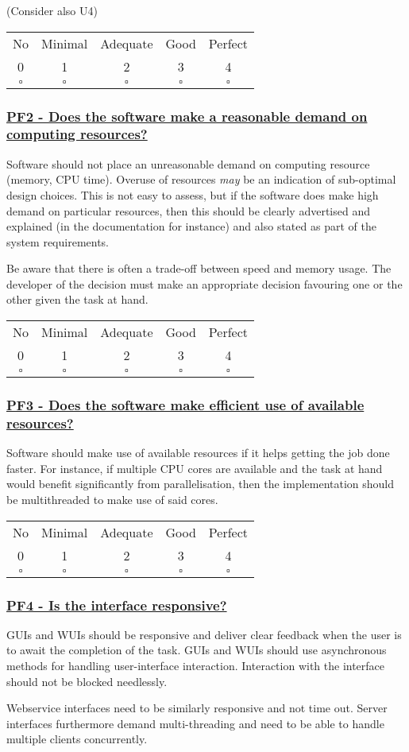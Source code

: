 \documentclass[a4paper,11pt]{article}
\newcommand{\criterion}[2]{\subsubsection*{\underline{#1 - #2}}\label{id:#1}}
\newcommand\CheckTable{%
  \begin{tabular}{ccccc}
    No & Minimal & Adequate & Good & Perfect \\
    0 & 1 & 2 & 3 & 4 \\
    \hline
    $\square$ & $\square$ & $\square$ & $\square$ & $\square$ \\
  \end{tabular}%
}
\begin{document}
%
%
%
(Consider also U4)

\CheckTable

\newcommand{\pfTwoID}{PF2}
\newcommand{\pfTwoText}{Does the software make a reasonable demand on computing resources?}
\criterion{\pfTwoID}{\pfTwoText}

Software should not place an unreasonable demand on computing resource (memory,
CPU time). Overuse of resources \emph{may} be an indication of sub-optimal
design choices.  This is not easy to assess, but if the software does make high
demand on particular resources, then this should be clearly advertised and
explained (in the documentation for instance) and also stated as part of the
system requirements.

Be aware that there is often a trade-off between speed and memory usage. The
developer of the decision must make an appropriate decision favouring one or the other
given the task at hand. 

\CheckTable

\newcommand{\pfThreeID}{PF3}
\newcommand{\pfThreeText}{Does the software make efficient use of available resources?}
\criterion{\pfThreeID}{\pfThreeText}

Software should make use of available resources if it helps getting the job
done faster. For instance, if multiple CPU cores are available and the task at hand
would benefit significantly from parallelisation, then the implementation should be
multithreaded to make use of said cores.

\CheckTable

\newcommand{\pfFourID}{PF4}
\newcommand{\pfFourText}{Is the interface responsive?}
\criterion{\pfFourID}{\pfFourText}

GUIs and WUIs should be responsive and deliver clear feedback when the user is
to await the completion of the task. GUIs and WUIs should use asynchronous methods for
handling user-interface interaction. Interaction with the interface should not
be blocked needlessly.

Webservice interfaces need to be similarly responsive and not time out. Server interfaces furthermore demand multi-threading and need to be able to handle
multiple clients concurrently.
\end{document}
